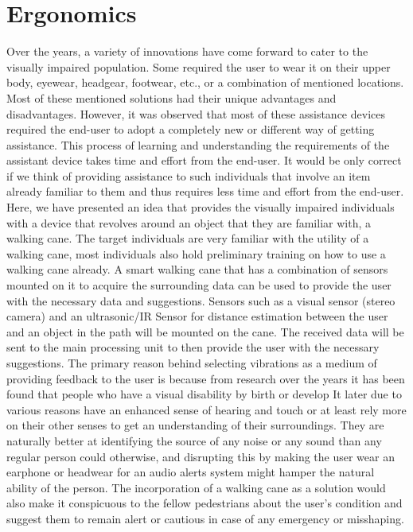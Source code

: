 \documentclass[conference]{IEEEtran}
\begin{document}
\section{Ergonomics}
Over the years, a variety of innovations have come forward to cater to the visually impaired population. Some required the user to wear it on their upper body, eyewear, headgear, footwear, etc., or a combination of mentioned locations. Most of these mentioned solutions had their unique advantages and disadvantages. However, it was observed that most of these assistance devices required the end-user to adopt a completely new or different way of getting assistance. This process of learning and understanding the requirements of the assistant device takes time and effort from the end-user. It would be only correct if we think of providing assistance to such individuals that involve an item already familiar to them and thus requires less time and effort from the end-user. Here, we have presented an idea that provides the visually impaired individuals with a device that revolves around an object that they are familiar with, a walking cane. The target individuals are very familiar with the utility of a walking cane, most individuals also hold preliminary training on how to use a walking cane already. A smart walking cane that has a combination of sensors mounted on it to acquire the surrounding data can be used to provide the user with the necessary data and suggestions. Sensors such as a visual sensor (stereo camera) and an ultrasonic/IR Sensor for distance estimation between the user and an object in the path will be mounted on the cane. The received data will be sent to the main processing unit to then provide the user with the necessary suggestions. The primary reason behind selecting vibrations as a medium of providing feedback to the user is because from research over the years it has been found that people who have a visual disability by birth or develop It later due to various reasons have an enhanced sense of hearing and touch or at least rely more on their other senses to get an understanding of their surroundings. They are naturally better at identifying the source of any noise or any sound than any regular person could otherwise, and disrupting this by making the user wear an earphone or headwear for an audio alerts system might hamper the natural ability of the person. The incorporation of a walking cane as a solution would also make it conspicuous to the fellow pedestrians about the user's condition and suggest them to remain alert or cautious in case of any emergency or misshaping.
\end{document}
